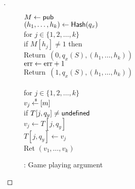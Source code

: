 \begin{proof}[]
\begin{figure}
{{$M \gets{\sf pub} $\\
$(h_1, \ldots, h_{k}) \gets \mathsf{Hash}(q_x)$\\
for $j \in \{1,2,\ldots,k\}$\\
\nudge if $M[h_j] \neq 1$ then \\
\nudge \nudge Return~$(0,q_x(S), (h_1, \ldots, h_{k}) )$\\
$\mathrm{err} \gets \mathrm{err} +1$\\
Return~$(1,q_x(S), (h_1, \ldots, h_{k}) )$\\
%
\\
for $j \in \{1,2,\ldots,k\}$\\
\nudge $v_j {\:\stackrel{{\scriptscriptstyle \hspace{0.2em}\$}} {\leftarrow}\:} [m]$\\
\nudge if $T[j,q_y] \neq \mathsf{undefined}$\\
\nudge \nudge $v_j \gets T[j,q_y]$\\
\nudge $T[j,q_y] \gets v_j$\\
Ret $\left(v_1,\ldots,v_k\right)$
}
}
\caption{: Game playing argument}\label{fig:3TGame}
\end{figure}
\begin{figure}
\end{figure}
\end{proof}
